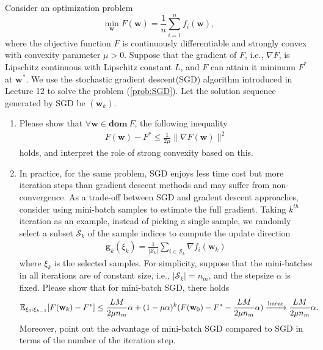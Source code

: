 \documentclass[11pt,letter,notitlepage]{article}
\begin{document}
\clearpage
\begin{exercise}
Consider an optimization problem
\begin{equation}\label{prob:SGD}
    \min_{\mathbf{w}} F(\mathbf{w})=\frac{1}{n}\sum_{i=1}^n f_i(\mathbf{w}),
\end{equation}
where the objective function $F$ is  continuously differentiable and strongly convex with convexity parameter $\mu>0$. Suppose that the gradient of $F$, i.e., $\nabla F$, is Lipschitz continuous with Lipschitz constant $L$, and $F$ can attain it minimum $F^*$ at $\mathbf{w}^*$. We use the stochastic gradient descent(SGD) algorithm introduced in Lecture 12 to solve the problem (\ref{prob:SGD}). Let the solution sequence generated by SGD be $(\mathbf{w}_k)$.
\begin{enumerate}
    \item Please show that $\forall\mathbf{w}\in\mathbf{dom }\ F$, the following  inequality
    \begin{align}
        F(\mathbf{w})-F^*\leq \frac{1}{2\mu}\|\nabla F(\mathbf{w})\|^2
    \end{align}
    holds, and interpret the role of strong convexity based on this.

	\item In practice, for the same problem, SGD enjoys less time cost but more iteration steps than gradient descent methods and may suffer from non-convergence. As a trade-off between SGD and gradent descent approaches, consider using mini-batch samples to estimate the full gradient. Taking $k^{th}$ iteration as an example, instead of picking a single sample, we randomly select a subset $\mathcal{S}_k$ of the sample indices to compute the update direction
	\begin{align*}
	    \mathbf{g}_k(\xi_k)=\frac{1}{|\mathcal{S}_k|}\sum_{i\in\mathcal{S}_k} \nabla f_{i}(\mathbf{w}_k)
	\end{align*}
	 where $\xi_k$ is the selected samples. For simplicity, suppose that the mini-batches in all iterations are of constant size, i.e., $|\mathcal{S}_k|=n_m$, and the stepsize $\alpha$ is fixed. Please show that for mini-batch SGD, there holds
	\begin{align*}
			\mathbb{E}_{\xi_0:\xi_{k-1}}[F(\mathbf{w}_{k})-F^*]&\leq\frac{LM}{2\mu n_m}\alpha+(1-\mu\alpha)^{k}(F(\mathbf{w}_0)-F^*-\frac{LM}{2\mu n_m}\alpha)
			\xrightarrow[]{\textup{linear}}\frac{LM}{2\mu n_m}\alpha.
	\end{align*}
	Moreover, point out the advantage of mini-batch SGD compared to SGD
	in terms of the number of the iteration step.
	

	
\end{enumerate}


\end{exercise}
\begin{solution}
    
\end{solution}

\clearpage{$ $}


\clearpage


\clearpage


\newpage



	
\end{document}
